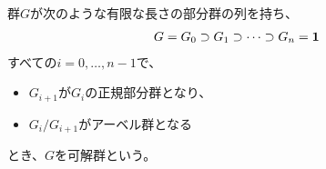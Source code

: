 {	\begin{definition}[可解群]\label{def:可解群} %
		群$G$が次のような有限な長さの部分群の列を持ち、
		\begin{equation*}\begin{split}
			G = G_0 \supset G_1 \supset\cdots\supset G_n = {\mathbf{1}}
		\end{split}\end{equation*}
		すべての$i=0,\dots,n-1$で、
		\begin{itemize}\setlength{\itemsep}{-1mm} %
			\item $G_{i+1}$が$G_i$の正規部分群となり、
			\item $G_i/G_{i+1}$がアーベル群となる
		\end{itemize} %
		とき、$G$を可解群という。
	\end{definition} %

}
